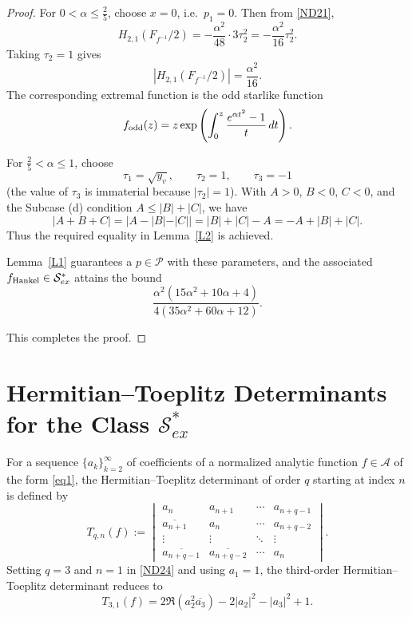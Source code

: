 \documentclass[11pt,reqno]{amsart}
\numberwithin{equation}{section}
\begin{document}
\begin{proof}
For $0<\alpha\le \frac25$, choose $x=0$, i.e.\ $p_1=0$. Then from \eqref{ND21},
\[
H_{2,1}(F_{f^{-1}}/2)
=
-\frac{\alpha^2}{48}\cdot 3\tau_2^2
=
-\frac{\alpha^2}{16}\tau_2^2.
\]
Taking $\tau_2=1$ gives
\[
|H_{2,1}(F_{f^{-1}}/2)|=\frac{\alpha^2}{16}.
\]
The corresponding extremal function is the odd starlike function
\[
f_{\rm odd}(z)
=
z\exp\left(
\int_0^z \frac{e^{\alpha t^2}-1}{t}\,dt
\right).
\]

For $\frac25<\alpha\le 1$, choose
\[
\tau_1=\sqrt{y_v},
\qquad
\tau_2=1,
\qquad
\tau_3=-1
\]
(the value of $\tau_3$ is immaterial because $|\tau_2|=1$). With $A>0$, $B<0$, $C<0$, and the Subcase (d) condition $A\le |B|+|C|$, we have
\[
|A+B+C|
=
|A-|B|-|C||
=
|B|+|C|-A
=
-A+|B|+|C|.
\]
Thus the required equality in Lemma~\ref{L2} is achieved.

Lemma~\ref{L1} guarantees a $p\in\mathcal{P}$ with these parameters, and the associated $f_{\rm Hankel}\in\mathcal{S}_{ex}^{\ast}$ attains the bound
\[
\frac{\alpha^2(15\alpha^2+10\alpha+4)}{4(35\alpha^2+60\alpha+12)}.
\]

This completes the proof.
\end{proof}
\section{Hermitian--Toeplitz Determinants for the Class $\mathcal{S}_{ex}^{\ast}$}

For a sequence $\{a_k\}_{k=2}^{\infty}$ of coefficients of a normalized analytic function $f\in\mathcal{A}$ of the form \eqref{eq1}, the Hermitian--Toeplitz determinant of order $q$ starting at index $n$ is defined by
\begin{equation}\label{ND24}
T_{q,n}(f) :=
\begin{vmatrix}
a_n & a_{n+1} & \cdots & a_{n+q-1} \\
\overline{a_{n+1}} & a_n & \cdots & a_{n+q-2} \\
\vdots & \vdots & \ddots & \vdots \\
\overline{a_{n+q-1}} & \overline{a_{n+q-2}} & \cdots & a_n
\end{vmatrix}.
\end{equation}
Setting $q=3$ and $n=1$ in \eqref{ND24} and using $a_1=1$, the third-order Hermitian--Toeplitz determinant reduces to
\begin{equation}\label{ND25}
T_{3,1}(f) = 2\Re\left(a_{2}^{2}\overline{a_{3}}\right) - 2|a_{2}|^{2} - |a_{3}|^{2} + 1.
\end{equation}
\end{document}
